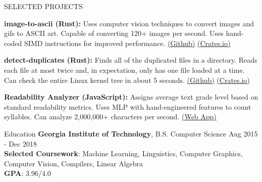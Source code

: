 \documentclass{resume} %
\begin{document}
    \begin{rSection}{SELECTED PROJECTS}
        \item \textbf{image-to-ascii (Rust):} {Uses computer vision techniques to convert images and gifs to ASCII art. Capable of converting 120+ images per second. Uses hand-coded SIMD instructions for improved performance. \href{https://github.com/kpberry/image-to-ascii}{(Github)} \href{https://crates.io/crates/image-to-ascii}{(Crates.io)}}
        \item \textbf{detect-duplicates (Rust):} {Finds all of the duplicated files in a directory. Reads each file at most twice and, in expectation, only has one file loaded at a time. Can check the entire Linux kernel tree in about 5 seconds. \href{https://github.com/kpberry/detect-duplicates}{(Github)} \href{https://crates.io/cates/detect-duplicates}{(Crates.io)}}
        \item \textbf{Readability Analyzer (JavaScript):} {Assigns average text grade level based on standard readability metrics. Uses MLP with hand-engineered features to count syllables. Can analyze 2,000,000+ characters per second. \href{https://kpberry.github.io/readability.html}{(Web App)}}
    \end{rSection}

    \begin{rSection}{Education}
        {\bf Georgia Institute of Technology}, B.S. Computer Science \hfill {Aug 2015 - Dec 2018}\\
        {\bf Selected Coursework}: Machine Learning, Linguistics, Computer Graphics, Computer Vision, Compilers, Linear Algebra\\
        {\bf GPA}: 3.96/4.0
    \end{rSection}
\end{document}
